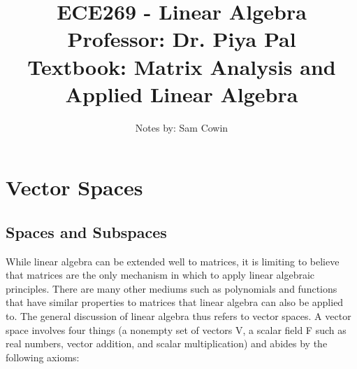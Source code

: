 \documentclass[12pt]{article}
\begin{document}
\title{ECE269 - Linear Algebra \\
\large Professor: Dr. Piya Pal \\
\large Textbook: Matrix Analysis and Applied Linear Algebra}
\author{Notes by: Sam Cowin}
\maketitle

\section{Vector Spaces}
\subsection{Spaces and Subspaces}
While linear algebra can be extended well to matrices, it is limiting to believe that matrices are the only mechanism in which to apply linear algebraic principles. There are 
many other mediums such as polynomials and functions that have similar properties to matrices that linear algebra can also be applied to. The general discussion of linear 
algebra thus refers to vector spaces. 
\newline
\newline
A vector space involves four things (a nonempty set of vectors V, a scalar field F such as real numbers, vector addition, and scalar multiplication) and abides by the following 
axioms:
\end{document}
